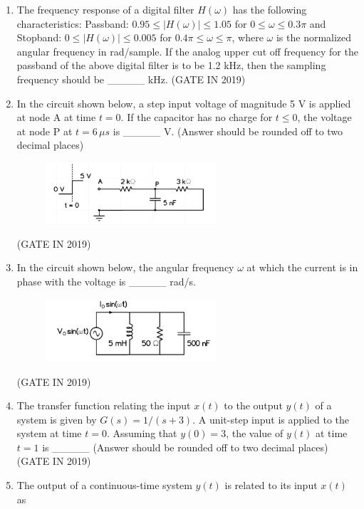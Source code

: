 \documentclass[journal]{IEEEtran}
\begin{document}
\begin{enumerate}
\item The frequency response of a digital filter $H(\omega)$ has the following characteristics: Passband: $0.95 \leq |H(\omega)| \leq 1.05$ for $0 \leq \omega \leq 0.3\pi$ and Stopband: $0 \leq |H(\omega)| \leq 0.005$ for $0.4\pi \leq \omega \leq \pi$, where $\omega$ is the normalized angular frequency in rad/sample. If the analog upper cut off frequency for the passband of the above digital filter is to be 1.2 kHz, then the sampling frequency should be \_\_\_\_\_ kHz.
\hfill(GATE IN 2019)
\item In the circuit shown below, a step input voltage of magnitude 5 V is applied at node A at time $t = 0$. If the capacitor has no charge for $t \leq 0$, the voltage at node P at $t = 6 \, \mu s$ is \_\_\_\_\_ V. (Answer should be rounded off to two decimal places)
\begin{figure}[H]
    \centering
    \includegraphics[width=0.6\textwidth]{17.png}
    \caption{}
    \label{fig:fig17}
\end{figure}
\hfill(GATE IN 2019)
\item In the circuit shown below, the angular frequency $\omega$ at which the current is in phase with the voltage is \_\_\_\_\_ rad/s.
\begin{figure}[H]
    \centering
    \includegraphics[width=0.6\textwidth]{18.png}
    \caption{}
    \label{fig:fig18}
\end{figure}
\hfill(GATE IN 2019)
\item The transfer function relating the input $x(t)$ to the output $y(t)$ of a system is given by $G(s) = 1/(s + 3)$. A unit-step input is applied to the system at time $t = 0$. Assuming that $y(0) = 3$, the value of $y(t)$ at time $t = 1$ is \_\_\_\_\_ (Answer should be rounded off to two decimal places)
\hfill(GATE IN 2019)
\item The output of a continuous-time system $y(t)$ is related to its input $x(t)$ as

\end{enumerate}
\end{document}
